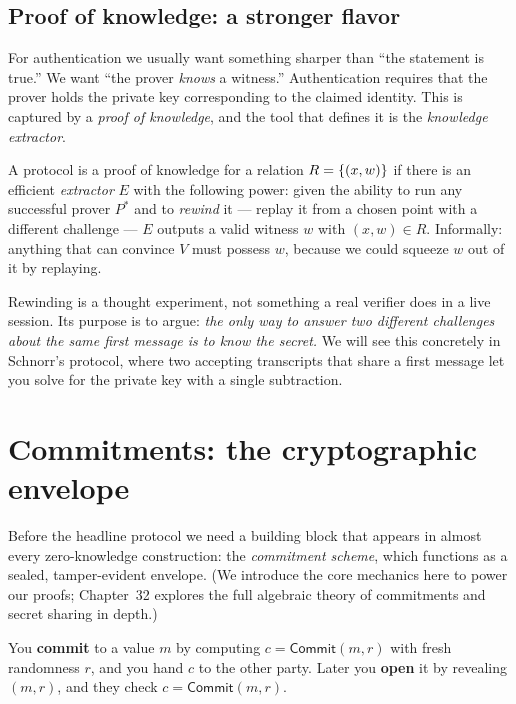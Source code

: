 \subsection*{Proof of knowledge: a stronger flavor}

For authentication we usually want something sharper than ``the statement is
true.'' We want ``the prover \emph{knows} a witness.'' Authentication requires that the prover holds the private key corresponding to the claimed identity. This is captured by a
\emph{proof of knowledge}, and the tool that defines it is the
\emph{knowledge extractor}.

\begin{definition}
\label{ch31:def-pok}
A protocol is a proof of knowledge for a relation $R = \{(x,w)\}$ if there is
an efficient \emph{extractor} $E$ with the following power: given the ability to
run any successful prover $P^*$ and to \emph{rewind} it --- replay it from a
chosen point with a different challenge --- $E$ outputs a valid witness $w$ with
$(x,w) \in R$. Informally: anything that can convince $V$ must possess $w$,
because we could squeeze $w$ out of it by replaying.
\end{definition}

Rewinding is a thought experiment, not something a real verifier does in a live
session. Its purpose is to argue: \emph{the only way to answer two different
challenges about the same first message is to know the secret.} We will see this
concretely in Schnorr's protocol, where two accepting transcripts that share a
first message let you solve for the private key with a single subtraction.

\section{Commitments: the cryptographic envelope}
\label{ch31:commit}

Before the headline protocol we need a building block that appears in almost
every zero-knowledge construction: the \emph{commitment scheme}, which functions as
a sealed, tamper-evident envelope. (We introduce the core mechanics here to power
our proofs; Chapter~32 explores the full algebraic theory of commitments and
secret sharing in depth.)

You \textbf{commit} to a value $m$ by computing $c = \mathsf{Commit}(m, r)$ with
fresh randomness $r$, and you hand $c$ to the other party. Later you
\textbf{open} it by revealing $(m, r)$, and they check $c = \mathsf{Commit}(m,r)$.

